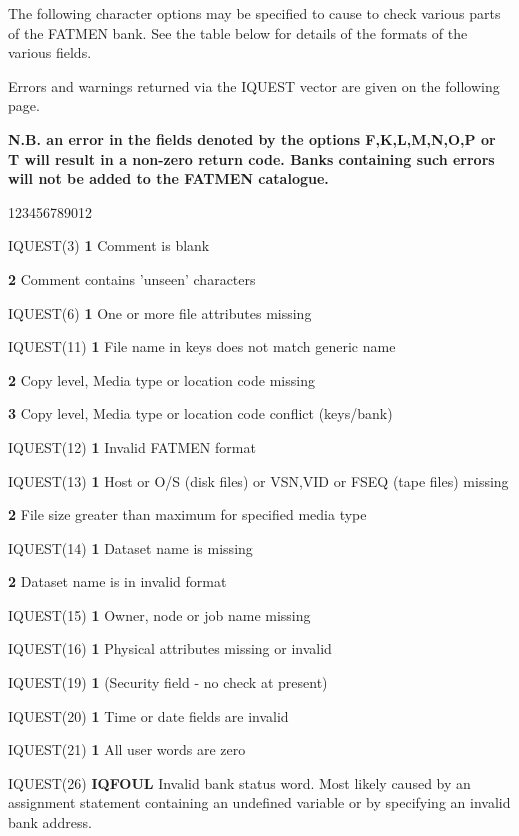 \par
The following character options may be specified to cause 
to check various parts of the FATMEN bank.
See the table below for details of the formats of the various
fields.
\par
Errors and warnings returned via the IQUEST vector are given on the
following page.
\par
{\bf N.B. an error in the fields denoted by the options F,K,L,M,N,O,P
or T will result in a non-zero return code. Banks containing such errors
will not be added to the FATMEN catalogue.}
\begin{DLtt}{123456789012}
\item[IQUEST(3)]{\bf 1 }Comment is blank
\item[]{\bf 2 }Comment contains 'unseen' characters
\item[IQUEST(6)]{\bf 1 }One or more file attributes missing
\item[IQUEST(11)]{\bf 1 }File name in keys does not match generic name
\item[]{\bf 2 }Copy level, Media type or location code missing
\item[]{\bf 3 }Copy level, Media type or location code conflict (keys/bank)
\item[IQUEST(12)]{\bf 1 }Invalid FATMEN format
\item[IQUEST(13)]{\bf 1 }Host or O/S (disk files) or
VSN,VID or FSEQ (tape files) missing
\item[]{\bf 2 }File size greater than maximum for specified media type
\item[IQUEST(14)]{\bf 1 }Dataset name is missing
\item[]{\bf 2 }Dataset name is in invalid format
\item[IQUEST(15)]{\bf 1 }Owner, node or job name missing
\item[IQUEST(16)]{\bf 1 }Physical attributes missing or invalid
\item[IQUEST(19)]{\bf 1 }(Security field - no check at present)
\item[IQUEST(20)]{\bf 1 }Time or date fields are invalid
\item[IQUEST(21)]{\bf 1 }All user words are zero
\item[IQUEST(26)]{\bf IQFOUL }Invalid bank status word. Most likely caused
by an assignment statement containing an undefined variable
or by specifying an invalid bank address.
\end{DLtt}

